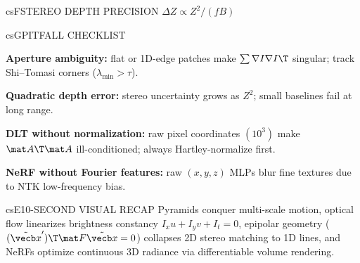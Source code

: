 \documentclass[../../../../master.tex]{subfiles}
\begin{document}
\begin{cscolumns}
\begin{cscard}{csF}{STEREO DEPTH PRECISION $\Delta Z \propto Z^2/(fB)$}
  \centering
\end{cscard}
\columnbreak

\begin{cscard}{csG}{PITFALL CHECKLIST}
  \begin{csbul}
    \item \textbf{Aperture ambiguity:} flat or 1D-edge patches make $\sum\nabla I\nabla I\T$ singular; track Shi--Tomasi corners ($\lambda_{\min}>\tau$).
    \item \textbf{Quadratic depth error:} stereo uncertainty grows as $Z^2$; small baselines fail at long range.
    \item \textbf{DLT without normalization:} raw pixel coordinates $(10^3)$ make $\mat A\T\mat A$ ill-conditioned; always Hartley-normalize first.
    \item \textbf{NeRF without Fourier features:} raw $(x,y,z)$ MLPs blur fine textures due to NTK low-frequency bias.
  \end{csbul}
\end{cscard}

\begin{cscard}{csE}{10-SECOND VISUAL RECAP}
  \sffamily\footnotesize
  Pyramids conquer multi-scale motion, optical flow linearizes brightness constancy $I_x u+I_y v+I_t=0$, epipolar geometry ($(\tilde{\vecb x}')\T\mat F\tilde{\vecb x}=0$) collapses 2D stereo matching to 1D lines, and NeRFs optimize continuous 3D radiance via differentiable volume rendering.
\end{cscard}
\end{cscolumns}

\csend
\end{document}
